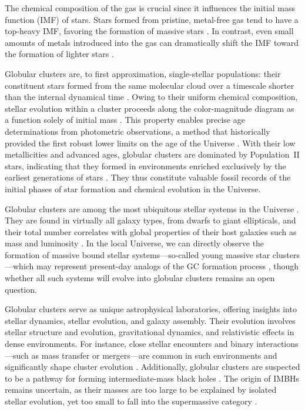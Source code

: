     The chemical composition of the gas is crucial since it influences the initial mass function (IMF) of stars. Stars formed from pristine, metal-free gas tend to have a top-heavy IMF, favoring the formation of massive stars \citep{2002ApJ...571...30S,2006MNRAS.369..825S}. In contrast, even small amounts of metals introduced into the gas can dramatically shift the IMF toward the formation of lighter stars \citep{2021MNRAS.508.4175C}.

    Globular clusters are, to first approximation, single-stellar populations: their constituent stars formed from the same molecular cloud over a timescale shorter than the internal dynamical time \citep{1988ApJ...324..288A,2009MNRAS.397..954F,2014PhR...539...49K}. Owing to their uniform chemical composition, stellar evolution within a cluster proceeds along the color-magnitude diagram as a function solely of initial mass \citep{2013sse..book.....K}. This property enables precise age determinations from photometric observations, a method that historically provided the first robust lower limits on the age of the Universe \citep{1959MNRAS.119..124H,1970ApJ...162..841S,1985A&A...147..169G,1992ApJ...400..265M}. With their low metallicities and advanced ages, globular clusters are dominated by Population~II stars, indicating that they formed in environments enriched exclusively by the earliest generations of stars \citep{2022A&A...668A.191C}. They thus constitute valuable fossil records of the initial phases of star formation and chemical evolution in the Universe.
    
    Globular clusters are among the most ubiquitous stellar systems in the Universe \citep{2006ARA&A..44..193B,2019ARA&A..57..227K}. They are found in virtually all galaxy types, from dwarfs to giant ellipticals, and their total number correlates with global properties of their host galaxies such as mass and luminosity \citep[e.g.,][]{2013ApJ...772...82H,2018MNRAS.481.5592F}. In the local Universe, we can directly observe the formation of massive bound stellar systems—so-called young massive star clusters—which may represent present-day analogs of the GC formation process \citep[e.g.,][]{2010ARA&A..48..431P,2020SSRv..216...69A}, though whether all such systems will evolve into globular clusters remains an open question.

    Globular clusters serve as unique astrophysical laboratories, offering insights into stellar dynamics, stellar evolution, and galaxy assembly. Their evolution involves stellar structure and evolution, gravitational dynamics, and relativistic effects in dense environments. For instance, close stellar encounters and binary interactions—such as mass transfer or mergers—are common in such environments and significantly shape cluster evolution \citep{2004MNRAS.349..129D,2016MNRAS.458.1450W,2024MNRAS.528.5119A}. Additionally, globular clusters are suspected to be a pathway for forming intermediate-mass black holes \citep{2013MNRAS.432.2779B,2015MNRAS.454.3150G}. The origin of IMBHs remains uncertain, as their masses are too large to be explained by isolated stellar evolution, yet too small to fall into the supermassive category \citep{2020ARA&A..58..257G}. 
    
